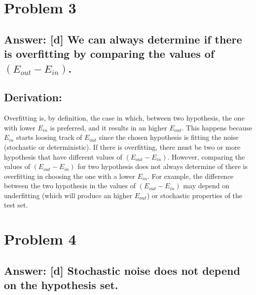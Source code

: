 \documentclass[11pt]{article}
\begin{document}
\hypertarget{problem-3}{%
\section{Problem 3}\label{problem-3}}

\hypertarget{answer-d-we-can-always-determine-if-there-is-overfitting-by-comparing-the-values-of-e_out-e_in.}{%
\subsection{\texorpdfstring{Answer: {[}d{]} We can always determine
if there is overfitting by comparing the values of
\((E_{out}-E_{in})\).}{Answer: {[}d{]} We can always determine if there is overfitting by comparing the values of (E\_\{out\}-E\_\{in\}).}}\label{answer-d-we-can-always-determine-if-there-is-overfitting-by-comparing-the-values-of-e_out-e_in.}}

\hypertarget{derivation}{%
\subsection{Derivation:}\label{derivation}}

Overfitting is, by definition, the case in which, between two
hypothesis, the one with lower \(E_{in}\) is preferred, and it results
in an higher \(E_{out}\). This happens because \(E_{in}\) starts loosing
track of \(E_{out}\) since the chosen hypothesis is fitting the noise
(stochastic or deterministic). If there is overfitting, there must be
two or more hypothesis that have different values of
\((E_{out}-E_{in})\). However, comparing the values of
\((E_{out}-E_{in})\) for two hypothesis does not always determine of
there is overfitting in choosing the one with a lower \(E_{in}\). For
example, the difference between the two hypothesis in the values of
\((E_{out}-E_{in})\) may depend on underfitting (which will produce an
higher \(E_{out}\)) or stochastic properties of the test set.

    \hypertarget{problem-4}{%
\section{Problem 4}\label{problem-4}}

\hypertarget{answer-d-stochastic-noise-does-not-depend-on-the-hypothesis-set.}{%
\subsection{Answer: {[}d{]} Stochastic noise does not depend on the
hypothesis
set.}\label{answer-d-stochastic-noise-does-not-depend-on-the-hypothesis-set.}}
\end{document}
